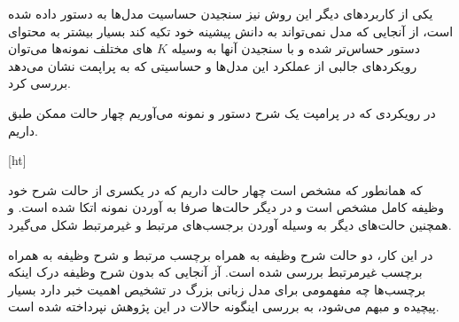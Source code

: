 یکی از کاربردهای دیگر این روش نیز سنجیدن حساسیت‌ مدل‌ها به دستور داده شده است، از آنجایی که مدل نمی‌تواند به دانش پیشینه خود تکیه کند بسیار بیشتر به محتوای دستور حساس‌تر شده و با سنجیدن آنها به وسیله
$K$
های مختلف نمونه‌ها می‌توان رویکرد‌های جالبی از عملکرد این مدل‌ها و حساسیتی که به پراپمت نشان می‌دهد بررسی کرد.

در رویکردی که در پرامپت یک شرح دستور و نمونه می‌آوریم چهار حالت ممکن طبق  داریم.

[ht]

که همانطور که مشخص است چهار حالت داریم که در یکسری از حالت شرح خود وظیفه کامل مشخص است و در دیگر حالت‌ها صرفا به آوردن نمونه اتکا شده است. و همچنین حالت‌های دیگر به وسیله آوردن برجسب‌های مرتبط و غیرمرتبط شکل می‌گیرد.

در این کار، دو حالت شرح وظیفه به همراه برچسب مرتبط و شرح وظیفه به همراه برچسب غیرمرتبط بررسی شده است. آز آنجایی که بدون شرح وظیفه درک اینکه برچسب‌ها چه مفهمومی برای مدل زبانی بزرگ در تشخیص اهمیت خبر دارد بسیار پیچیده و مبهم می‌شود، به بررسی اینگونه حالات در این پژوهش نپرداخته شده است.

